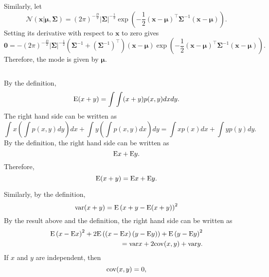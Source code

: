 Similarly, let
%
\begin{equation}
\mathcal{N} \left( \mathbf{x} | \bm{\mu}, \bm{\Sigma} \right) = \left( 2 \pi \right) ^ {- \frac{D}{2}} |\bm{\Sigma}| ^ {- \frac{1}{2}} \exp \left( - \frac{1}{2} (\mathbf{x} - \bm{\mu}) ^ \intercal \bm{\Sigma} ^ {- 1} (\mathbf{x} - \bm{\mu}) \right).
\end{equation}
%
Setting its derivative with respect to $\mathbf{x}$ to zero gives
%
\begin{equation}
\mathbf{0} = - \left( 2 \pi \right) ^ {- \frac{D}{2}} |\bm{\Sigma}| ^ {- \frac{1}{2}} \left( \bm{\Sigma} ^ {- 1} + \left( \bm{\Sigma} ^ {- 1} \right) ^ \intercal \right) (\mathbf{x} - \bm{\mu}) \exp \left( - \frac{1}{2} (\mathbf{x} - \bm{\mu}) ^ \intercal \bm{\Sigma} ^ {- 1} (\mathbf{x} - \bm{\mu}) \right).
\end{equation}
%
Therefore, the mode is given by $\bm{\mu}$.


\subsection{}
\label{1.10}
By the definition,
%
\begin{equation}
{\rm E} (x + y) = \int \int (x + y) p(x, y) dx dy.
\end{equation}
%
The right hand side can be written as 
%
\begin{equation}
\int x \left( \int p(x, y) dy \right) dx + \int y \left( \int p(x, y) dx \right) dy = \int x p(x) dx + \int y p(y) dy.
\end{equation}
%
By the definition, the right hand side can be written as 
%
\begin{equation}
{\rm E} x + {\rm E} y.
\end{equation}
%
Therefore, 
%
\begin{equation}
{\rm E} (x + y) = {\rm E} x + {\rm E} y.
\end{equation}
%

Similarly, by the definition,
%
\begin{equation}
{\rm var} (x + y) = {\rm E} \left( x + y - {\rm E} (x + y) \right) ^ 2
\end{equation}
%
By the result above and the definition, the right hand side can be written as 
%
\begin{equation}
\begin{aligned}
{\rm E} \left( x - {\rm E} x \right) ^ 2 + 2 {\rm E} \left( \left( x - {\rm E} x \right) \left( y - {\rm E} y \right) \right) + {\rm E} \left( y - {\rm E} y \right) ^ 2 \\
= {\rm var} x + 2 {\rm cov} (x, y) + {\rm var} y.
\end{aligned}
\end{equation}
%
If $x$ and $y$ are independent, then 
%
\begin{equation}
{\rm cov} (x, y) = 0,
\end{equation}

